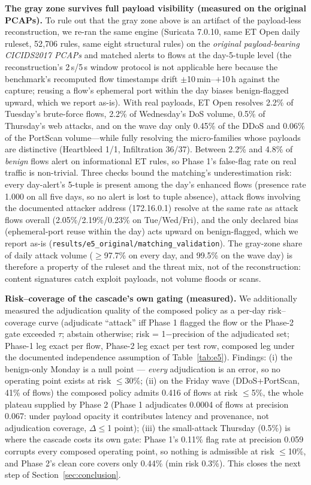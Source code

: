 \documentclass[sigconf,anonymous=false]{acmart}
\begin{document}
\textbf{The gray zone survives full payload visibility (measured on the original PCAPs).} To rule out that the gray zone above is an artifact of the payload-less reconstruction, we re-ran the same engine (Suricata 7.0.10, same ET Open daily ruleset, 52{,}706 rules, same eight structural rules) on the \emph{original payload-bearing CICIDS2017 PCAPs} and matched alerts to flows at the day-5-tuple level (the reconstruction's 2\,s/5\,s window protocol is not applicable here because the benchmark's recomputed flow timestamps drift $\pm$10\,min--$+$10\,h against the capture; reusing a flow's ephemeral port within the day biases benign-flagged upward, which we report as-is). With real payloads, ET Open resolves 2.2\% of Tuesday's brute-force flows, 2.2\% of Wednesday's DoS volume, 0.5\% of Thursday's web attacks, and on the wave day only 0.45\% of the DDoS and 0.06\% of the PortScan volume---while fully resolving the micro-families whose payloads are distinctive (Heartbleed 1/1, Infiltration 36/37). Between 2.2\% and 4.8\% of \emph{benign} flows alert on informational ET rules, so Phase 1's false-flag rate on real traffic is non-trivial. Three checks bound the matching's underestimation risk: every day-alert's 5-tuple is present among the day's enhanced flows (presence rate 1.000 on all five days, so no alert is lost to tuple absence), attack flows involving the documented attacker address (172.16.0.1) resolve at the same rate as attack flows overall (2.05\%/2.19\%/0.23\% on Tue/Wed/Fri), and the only declared bias (ephemeral-port reuse within the day) acts upward on benign-flagged, which we report as-is (\texttt{results/e5\_original/matching\_validation}). The gray-zone share of daily attack volume ($\ge$97.7\% on every day, and 99.5\% on the wave day) is therefore a property of the ruleset and the threat mix, not of the reconstruction: content signatures catch exploit payloads, not volume floods or scans.

\textbf{Risk--coverage of the cascade's own gating (measured).} We additionally measured the adjudication quality of the composed policy as a per-day risk--coverage curve (adjudicate ``attack'' iff Phase 1 flagged the flow or the Phase-2 gate exceeded $\tau$; abstain otherwise; risk = 1$-$precision of the adjudicated set; Phase-1 leg exact per flow, Phase-2 leg exact per test row, composed leg under the documented independence assumption of Table~\ref{tab:e5}). Findings: (i) the benign-only Monday is a null point --- \emph{every} adjudication is an error, so no operating point exists at risk $\le$30\%; (ii) on the Friday wave (DDoS+PortScan, 41\% of flows) the composed policy admits 0.416 of flows at risk $\le$5\%, the whole plateau supplied by Phase 2 (Phase 1 adjudicates 0.0004 of flows at precision 0.067: under payload opacity it contributes latency and provenance, not adjudication coverage, $\Delta\le$1 point); (iii) the small-attack Thursday (0.5\%) is where the cascade costs its own gate: Phase 1's 0.11\% flag rate at precision 0.059 corrupts every composed operating point, so nothing is admissible at risk $\le$10\%, and Phase 2's clean core covers only 0.44\% (min risk 0.3\%). This closes the next step of Section~\ref{sec:conclusion}.
\end{document}
